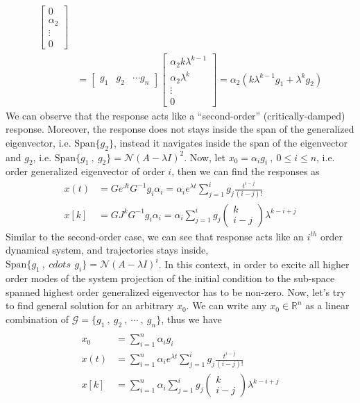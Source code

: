 \documentclass[twoside]{article}
\begin{document}
\begin{align*}
%
	\left[ \begin{array}{c} 0 \\ \alpha_2 \\ \vdots \\ 0 \end{array} \right] 
	\\ 
	&= \left[ \begin{array}{ccc} g_1 & g_2 & \cdots g_n \end{array} \right] \left[ \begin{array}{c} \alpha_2 k \lambda^{k-1} \\ \alpha_2 \lambda^k \\ \vdots \\ 0 \end{array} \right] = \alpha_2 \left( k \lambda^{k-1} g_1  + \lambda^k g_2 \right)
\end{align*}
%
We can observe that the response acts like a ``second-order'' (critically-damped) response. Moreover, the response does not stays inside the span of the 
generalized eigenvector, i.e. $\mathrm{Span} \lbrace g_2 \rbrace$, instead it navigates inside the span of the eigenvector and $g_2$, i.e. 
$\mathrm{Span} \lbrace g_1 \ , \ g_2 \rbrace = \mathcal{N}(A - \lambda I)^2$. Now, let $x_0 = \alpha_i g_i \ , \ 0 \leq i \leq n$, i.e. order generalized eigenvector
of order $i$, then we can find the responses as
%
\begin{align*}
x(t) &= G e^{J t} G^{-1} g_i \alpha_i = \alpha_i e^{\lambda t} \sum\limits_{j=1}^{i}  g_j \frac{t^{i-j}}{(i-j)!}
\\
x[k] &= G J^k G^{-1} g_i \alpha_i = \alpha_i \sum\limits_{j=1}^{i}  g_j \begin{pmatrix} k \\ i-j \end{pmatrix} \lambda^{k-i+j}  
\end{align*}
%
Similar to the second-order case, we can see that response acts like an $i^{th}$ order dynamical system, and trajectories stays inside,
$\mathrm{Span} \lbrace g_1 \ , \ cdots \, \ g_i \rbrace = \mathcal{N}(A - \lambda I)^i$. In this context, in order to excite all higher order modes 
of the system projection of the initial condition to the sub-space spanned highest order generalized eigenvector has to be non-zero. Now, 
let's try to find general solution for an arbitrary $x_0$. We can write any $x_0 \in \mathbb{R}^{n}$ as a linear combination of 
$\mathcal{G} = \lbrace g_1 \ , \ g_2 \ , \ \cdots \ , \ g_n \rbrace$, thus we have
%
\begin{align*}
\\
x_0 &= \sum\limits_{i=1}^n \alpha_i g_i
\\
x(t) &= \sum\limits_{i=1}^n \alpha_i e^{\lambda t} \sum\limits_{j=1}^{i}  g_j \frac{t^{i-j}}{(i-j)!}
\\
x[k] &= \sum\limits_{i=1}^n \alpha_i \sum\limits_{j=1}^{i}  g_j \begin{pmatrix} k \\ i-j \end{pmatrix} \lambda^{k-i+j}  
\end{align*}
\end{document}
